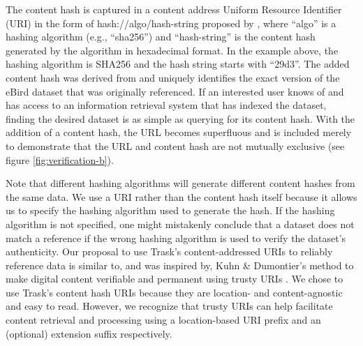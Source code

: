 The content hash is captured in a content address Uniform Resource Identifier (URI) \citep{rfc3986} in the form of hash://algo/hash-string proposed by \citep{Trask_2015}, where ``algo'' is a hashing algorithm (e.g., ``sha256'') and ``hash-string'' is the content hash generated by the algorithm in hexadecimal format. In the example above, the hashing algorithm is SHA256 and the hash string starts with ``29d3''. The added content hash was derived from and uniquely identifies the exact version of the eBird dataset that was originally referenced. If an interested user knows of and has access to an information retrieval system that has indexed the dataset, finding the desired dataset is as simple as querying for its content hash. With the addition of a content hash, the URL becomes superfluous and is included merely to demonstrate that the URL and content hash are not mutually exclusive (see figure \ref{fig:verification-b}).

Note that different hashing algorithms will generate different content hashes from the same data. We use a URI rather than the content hash itself because it allows us to specify the hashing algorithm used to generate the hash. If the hashing algorithm is not specified, one might mistakenly conclude that a dataset does not match a reference if the wrong hashing algorithm is used to verify the dataset's authenticity. Our proposal to use Trask's content-addressed URIs to reliably reference data is similar to, and was inspired by, Kuhn \& Dumontier's method to make digital content verifiable and permanent using trusty URIs \citep{Kuhn_2015}. We chose to use Trask's content hash URIs because they are location- and content-agnostic and easy to read. However, we recognize that trusty URIs can help facilitate content retrieval and processing using a location-based URI prefix and an (optional) extension suffix respectively.

